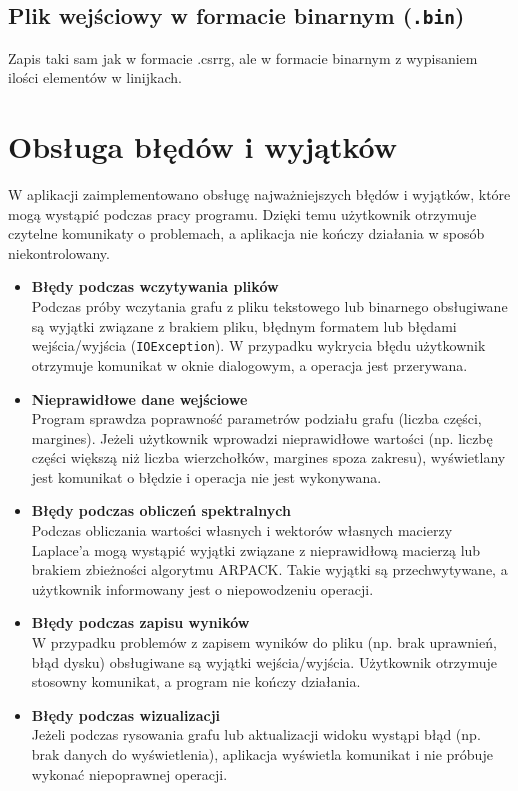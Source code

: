 \documentclass{article}
\begin{document}
    \subsection{Plik wejściowy w formacie binarnym (\texttt{.bin})}
    Zapis taki sam jak w formacie .csrrg, ale w formacie binarnym z wypisaniem ilości elementów w linijkach.



\section{Obsługa błędów i wyjątków}

    W aplikacji zaimplementowano obsługę najważniejszych błędów i wyjątków, które mogą wystąpić podczas pracy programu. Dzięki temu użytkownik otrzymuje czytelne komunikaty o problemach, a aplikacja nie kończy działania w sposób niekontrolowany.
    
    \begin{itemize}
        \item \textbf{Błędy podczas wczytywania plików} \\
        Podczas próby wczytania grafu z pliku tekstowego lub binarnego obsługiwane są wyjątki związane z brakiem pliku, błędnym formatem lub błędami wejścia/wyjścia (\texttt{IOException}). W przypadku wykrycia błędu użytkownik otrzymuje komunikat w oknie dialogowym, a operacja jest przerywana.
    
        \item \textbf{Nieprawidłowe dane wejściowe} \\
        Program sprawdza poprawność parametrów podziału grafu (liczba części, margines). Jeżeli użytkownik wprowadzi nieprawidłowe wartości (np. liczbę części większą niż liczba wierzchołków, margines spoza zakresu), wyświetlany jest komunikat o błędzie i operacja nie jest wykonywana.
    
        \item \textbf{Błędy podczas obliczeń spektralnych} \\
        Podczas obliczania wartości własnych i wektorów własnych macierzy Laplace'a mogą wystąpić wyjątki związane z nieprawidłową macierzą lub brakiem zbieżności algorytmu ARPACK. Takie wyjątki są przechwytywane, a użytkownik informowany jest o niepowodzeniu operacji.
    
        \item \textbf{Błędy podczas zapisu wyników} \\
        W przypadku problemów z zapisem wyników do pliku (np. brak uprawnień, błąd dysku) obsługiwane są wyjątki wejścia/wyjścia. Użytkownik otrzymuje stosowny komunikat, a program nie kończy działania.
    
        \item \textbf{Błędy podczas wizualizacji} \\
        Jeżeli podczas rysowania grafu lub aktualizacji widoku wystąpi błąd (np. brak danych do wyświetlenia), aplikacja wyświetla komunikat i nie próbuje wykonać niepoprawnej operacji.
    \end{itemize}
    
\end{document}
